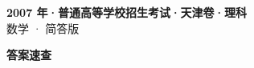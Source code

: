\documentclass[zihao=-4, a4paper]{ctexart}
\begin{document}
\begin{center}
  {\Large\bfseries 2007 年·普通高等学校招生考试·天津卷·理科}\\[4pt]
  {\large 数学 · 简答版}
\end{center}
\medskip
{}

\clearpage
{}
\begin{center}{\Large\bfseries 答案速查}\end{center}
\medskip

\end{document}
